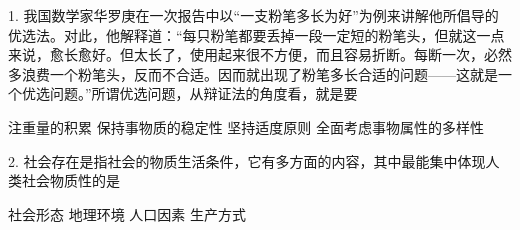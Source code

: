 1. 我国数学家华罗庚在一次报告中以“一支粉笔多长为好”为例来讲解他所倡导的优选法。对此，他解释道：“每只粉笔都要丢掉一段一定短的粉笔头，但就这一点来说，愈长愈好。但太长了，使用起来很不方便，而且容易折断。每断一次，必然多浪费一个粉笔头，反而不合适。因而就出现了粉笔多长合适的问题——这就是一个优选问题。”所谓优选问题，从辩证法的角度看，就是要
\begin{choices}
	 注重量的积累
	 保持事物质的稳定性
	 坚持适度原则
	 全面考虑事物属性的多样性
\end{choices}
2. 社会存在是指社会的物质生活条件，它有多方面的内容，其中最能集中体现人类社会物质性的是
\begin{choices}
	 社会形态
	 地理环境
	 人口因素
	 生产方式
\end{choices}

